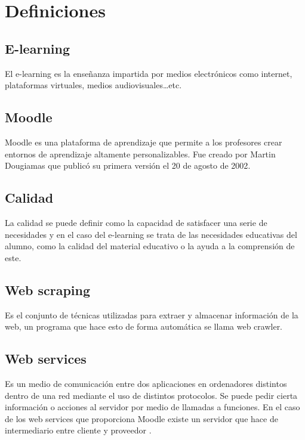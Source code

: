 

\section{Definiciones}

\subsection{E-learning}

El e-learning es la enseñanza impartida por medios electrónicos como internet, plataformas virtuales, medios audiovisuales…etc.

\subsection{Moodle}

Moodle es una plataforma de aprendizaje que permite a los profesores crear entornos de aprendizaje altamente personalizables. Fue creado por Martin Dougiamas que publicó su primera versión el 20 de agosto de 2002\cite{dougiamas2002interpretive}.

\subsection{Calidad}

La calidad se puede definir como la capacidad de satisfacer una serie de necesidades y en el caso del e-learning se trata de las necesidades educativas del alumno, como la calidad del material educativo o la ayuda a la comprensión de este.

\subsection{Web scraping}

Es el conjunto de técnicas utilizadas para extraer y almacenar información de la web, un programa que hace esto de forma automática se llama web crawler.

\subsection{Web services}

Es un medio de comunicación entre dos aplicaciones en ordenadores distintos dentro de una red mediante el uso de distintos protocolos. Se puede pedir cierta información o acciones al servidor por medio de llamadas a funciones. En el caso de los web services que proporciona Moodle existe un servidor que hace de intermediario entre cliente y proveedor \cite{moodle-2020}.

